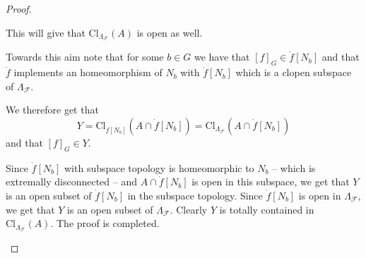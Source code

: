 \documentclass[10pt,a4paper]{amsart}
\newcommand{\F}{\mathcal{F}}
\begin{document}
\begin{proof}
\begin{description}
This will give that $\mathrm{Cl}_{\Lambda_\F}(A)$ is open as well. 

Towards this aim note that for some $b\in G$ we have that $[f]_G\in \dot{f}[N_b]$ and that $\dot{f}$ implements an homeomorphism of $N_b$ with $\dot{f}[N_b]$ which is a clopen subspace of $\Lambda_\F$.

We therefore get that 
\[
Y=\mathrm{Cl}_{\dot{f}[N_b]}(A\cap \dot{f}[N_b])=\mathrm{Cl}_{\Lambda_\F}(A\cap \dot{f}[N_b])
\]
and that $[f]_G\in Y$.

Since $\dot{f}[N_b]$ with subspace topology is homeomorphic to $N_b$ -- which is extremally disconnected -- and $A\cap \dot{f}[N_b]$ is open in this subspace, we get that $Y$ is an open subset of $\dot{f}[N_b]$ in the subspace topology. Since $\dot{f}[N_b]$ is open in $\Lambda_\F$, we get that $Y$ is an open subset of $\Lambda_\F$. Clearly $Y$ is totally contained in $\mathrm{Cl}_{\Lambda_\F}(A)$. 
The proof is completed.
\end{description}
\end{proof}
\end{document}
